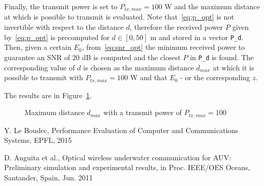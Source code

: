 \documentclass[10pt]{article}
\begin{document}
Finally, the transmit power is set to $P_{tx, max} = 100$ W and the maximum distance at which is possible to transmit is evaluated. Note that~\eqref{eq:p_opt} is not invertible with respect to the distance $d$, therefore the received power $P$ given by~\eqref{eq:p_opt} is precomputed for $d \in [0, 50]$ m and stored in a vector \texttt{P\_d}. Then, given a certain $E_0$, from~\eqref{eq:snr_opt} the minimum received power to guarantee an SNR of 20 dB is computed and the closest $P$ in \texttt{P\_d} is found. The corresponding value of $d$ is chosen as the maximum distance $d_{max}$ at which it is possible to transmit with $P_{tx, max} = 100$ W and that $E_0$ - or the corresponding $z$.

The results are in Figure~\ref{fig:dmax}.

\begin{figure}[h!]
	\centering
	\caption{Maximum distance $d_{max}$ with a transmit power of $P_{tx, max} = 100$}
	\label{fig:dmax}
\end{figure}


\begin{thebibliography}{10}

Y. Le Boudec, Performance Evaluation of Computer and Communications Systems, EPFL, 2015

D. Anguita et al., Optical wireless underwater communication for AUV: Preliminary simulation and experimental results, in Proc. IEEE/OES Oceans, Santander, Spain, Jun. 2011

\end{thebibliography}
\end{document}

